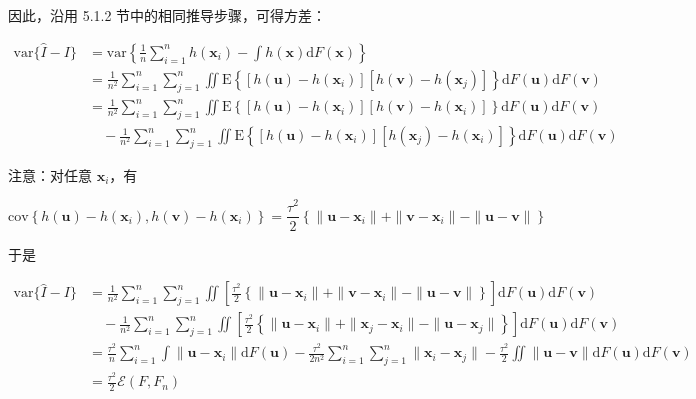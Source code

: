 \documentclass{ctexart}
\begin{document}
因此，沿用 5.1.2 节中的相同推导步骤，可得方差：

\begin{align*}
\mathrm{var}\{\widehat{I}-I\}&=\mathrm{var}\left\{\frac{1}{n}\sum_{i=1}^n h(\boldsymbol{x}_i)-\int h(\boldsymbol{x})\mathrm{d}F(\boldsymbol{x})\right\}\\
&=\frac{1}{n^2}\sum_{i=1}^n\sum_{j=1}^n\iint \mathrm{E}\left\{\left[h(\boldsymbol{u})-h(\boldsymbol{x}_i)\right]\left[h(\boldsymbol{v})-h(\boldsymbol{x}_j)\right]\right\}\mathrm{d}F(\boldsymbol{u})\mathrm{d}F(\boldsymbol{v})\\
&=\frac{1}{n^2}\sum_{i=1}^n\sum_{j=1}^n\iint \mathrm{E}\left\{\left[h(\boldsymbol{u})-h(\boldsymbol{x}_i)\right]\left[h(\boldsymbol{v})-h(\boldsymbol{x}_i)\right]\right\}\mathrm{d}F(\boldsymbol{u})\mathrm{d}F(\boldsymbol{v})\\
&\quad -\frac{1}{n^2}\sum_{i=1}^n\sum_{j=1}^n\iint \mathrm{E}\left\{\left[h(\boldsymbol{u})-h(\boldsymbol{x}_i)\right]\left[h(\boldsymbol{x}_j)-h(\boldsymbol{x}_i)\right]\right\}\mathrm{d}F(\boldsymbol{u})\mathrm{d}F(\boldsymbol{v})
\end{align*}

注意：对任意 $\boldsymbol{x}_i$，有

\begin{equation*}
\mathrm{cov}\left\{h(\boldsymbol{u})-h(\boldsymbol{x}_i),h(\boldsymbol{v})-h(\boldsymbol{x}_i)\right\}=\frac{\tau^2}{2}\left\{\|\boldsymbol{u}-\boldsymbol{x}_i\|+\|\boldsymbol{v}-\boldsymbol{x}_i\|-\|\boldsymbol{u}-\boldsymbol{v}\|\right\}
\end{equation*}

于是

\begin{align*}
\mathrm{var}\{\widehat{I}-I\}&=\frac{1}{n^2}\sum_{i=1}^n\sum_{j=1}^n\iint\left[\frac{\tau^2}{2}\left\{\|\boldsymbol{u}-\boldsymbol{x}_i\|+\|\boldsymbol{v}-\boldsymbol{x}_i\|-\|\boldsymbol{u}-\boldsymbol{v}\|\right\}\right]\mathrm{d}F(\boldsymbol{u})\mathrm{d}F(\boldsymbol{v})\\
&\quad -\frac{1}{n^2}\sum_{i=1}^n\sum_{j=1}^n\iint\left[\frac{\tau^2}{2}\left\{\|\boldsymbol{u}-\boldsymbol{x}_i\|+\|\boldsymbol{x}_j-\boldsymbol{x}_i\|-\|\boldsymbol{u}-\boldsymbol{x}_j\|\right\}\right]\mathrm{d}F(\boldsymbol{u})\mathrm{d}F(\boldsymbol{v})\\
&=\frac{\tau^2}{n}\sum_{i=1}^n\int\|\boldsymbol{u}-\boldsymbol{x}_i\|\mathrm{d}F(\boldsymbol{u})-\frac{\tau^2}{2n^2}\sum_{i=1}^n\sum_{j=1}^n\|\boldsymbol{x}_i-\boldsymbol{x}_j\|-\frac{\tau^2}{2}\iint\|\boldsymbol{u}-\boldsymbol{v}\|\mathrm{d}F(\boldsymbol{u})\mathrm{d}F(\boldsymbol{v})\\
&=\frac{\tau^2}{2}\mathcal{E}(F,F_n)
\end{align*}
\end{document}
